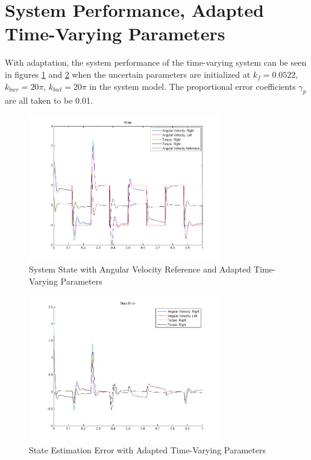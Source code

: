 \documentclass[letterpaper,12pt]{report}
\begin{document}
\section{System Performance, Adapted Time-Varying Parameters}
With adaptation, the system performance of the time-varying system can be seen in figures \ref{fig:ssATVpDiagram1} and \ref{fig:seATVpDiagram1} 
when the uncertain parameters are initialized at $k_f = 0.0522$, $k_{bwr} = 20\pi$, $k_{bwl} = 20\pi$ in the system model.
The proportional error coefficients $\gamma_p$ are all taken to be 0.01.
\begin{figure}[h]
	\centering
	\includegraphics[width=0.75\textwidth]{ATV_State1.jpg}
	\caption{System State with Angular Velocity Reference and Adapted Time-Varying Parameters}
	\label{fig:ssATVpDiagram1}
\end{figure}
\begin{figure}[h]
	\centering
	\includegraphics[width=0.75\textwidth]{ATV_StateError1.jpg}
	\caption{State Estimation Error with Adapted Time-Varying Parameters}
	\label{fig:seATVpDiagram1}
\end{figure}
\end{document}
